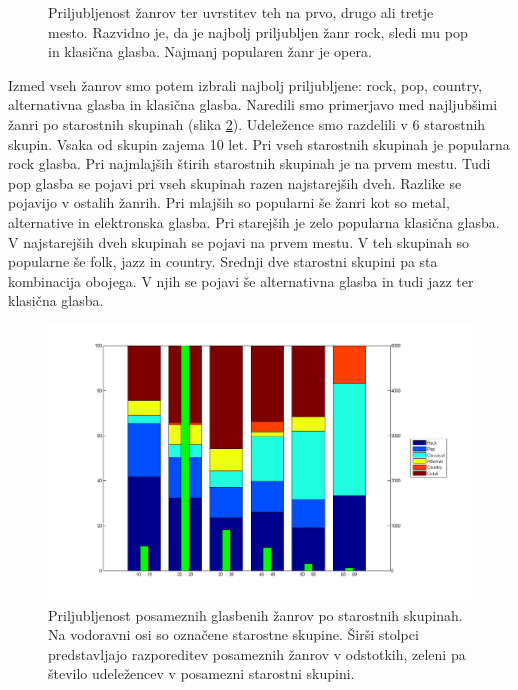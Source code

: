\documentclass[a4paper, 12pt]{book}
\begin{document}
{\begin{figure}[hbt]
\caption{Priljubljenost žanrov ter uvrstitev teh na prvo, drugo ali tretje mesto. Razvidno je, da je najbolj priljubljen žanr rock, sledi mu pop in klasična glasba. Najmanj popularen žanr je opera.}
\label{zanrigraf}
\end{figure}

Izmed vseh žanrov smo potem izbrali najbolj priljubljene: rock, pop, country, alternativna glasba in klasična glasba. Naredili smo primerjavo med najljubšimi žanri po starostnih skupinah (slika \ref{zanrigraftop}). Udeležence smo razdelili v 6 starostnih skupin. Vsaka od skupin zajema 10 let. Pri vseh starostnih skupinah je popularna rock glasba. Pri najmlajših štirih starostnih skupinah je na prvem mestu. Tudi pop glasba se pojavi pri vseh skupinah razen najstarejših dveh. Razlike se pojavijo v ostalih žanrih. Pri mlajših so popularni še žanri kot so metal, alternative in elektronska glasba. Pri starejših je zelo popularna klasična glasba. V najstarejših dveh skupinah se pojavi na prvem mestu. V teh skupinah so popularne še folk, jazz in country. Srednji dve starostni skupini pa sta kombinacija obojega. V njih se pojavi še alternativna glasba in tudi jazz ter klasična glasba. 

\begin{figure}[hbt]
\centering
\includegraphics[width=15cm]{images/genretop1.png}

\caption{Priljubljenost posameznih glasbenih žanrov po starostnih skupinah. Na vodoravni osi so označene starostne skupine. Širši stolpci predstavljajo razporeditev posameznih žanrov v odstotkih, zeleni pa število udeležencev v posamezni starostni skupini.  }
\label{zanrigraftop}
\end{figure}

}
\end{document}
